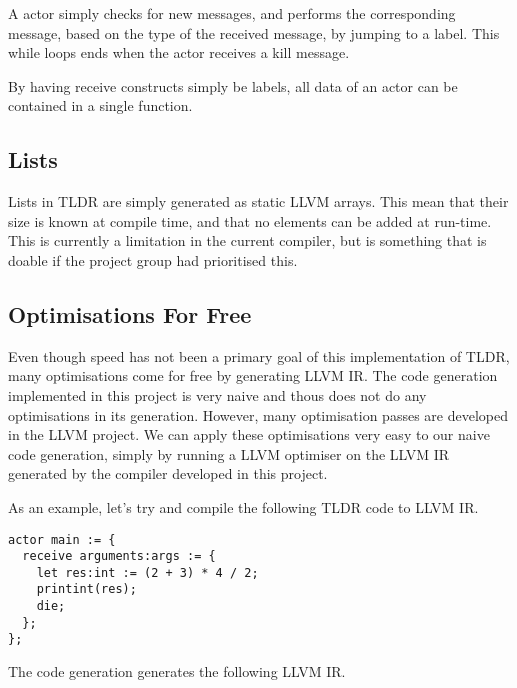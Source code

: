 A actor simply checks for new messages, and performs the corresponding message, based on the type of the received message, by jumping to a label. This while loops ends when the actor receives a kill message.

By having receive constructs simply be labels, all data of an actor can be contained in a single function.

\subsection{Lists}\label{codegen:lists}

Lists in TLDR are simply generated as static LLVM arrays. This mean that their size is known at compile time, and that no elements can be added at run-time. This is currently a limitation in the current compiler, but is something that is doable if the project group had prioritised this.

\subsection{Optimisations For Free}

Even though speed has not been a primary goal of this implementation of TLDR, many optimisations come for free by generating LLVM IR. The code generation implemented in this project is very naive and thous does not do any optimisations in its generation. However, many optimisation passes are developed in the LLVM project. We can apply these optimisations very easy to our naive code generation, simply by running a LLVM optimiser on the LLVM IR generated by the compiler developed in this project.

As an example, let's try and compile the following TLDR code to LLVM IR.

\begin{lstlisting}[breaklines]
actor main := {
  receive arguments:args := {
    let res:int := (2 + 3) * 4 / 2;
    printint(res);
    die;
  };
};
\end{lstlisting}

The code generation generates the following LLVM IR.

